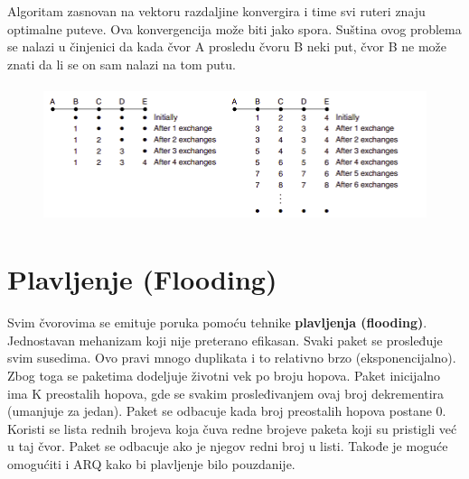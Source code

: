 \documentclass[a4paper]{article}
\begin{document}
        Algoritam zasnovan na vektoru razdaljine
        konvergira i time svi ruteri znaju optimalne puteve. Ova konvergencija može biti jako spora.
        Suština ovog problema se nalazi u činjenici da kada čvor A prosledu čvoru B neki put,
        čvor B ne može znati da li se on sam nalazi na tom putu.
        \begin{figure}[H]
            \begin{center}
                \includegraphics[width=120mm,height=40mm]{Slike/brojanje_do_beskonacnosti.png}
            \end{center}
        \end{figure}

\section{Plavljenje (Flooding)}
    Svim čvorovima se emituje poruka pomoću tehnike \textbf{plavljenja (flooding)}. Jednostavan mehanizam 
    koji nije preterano efikasan. Svaki paket se prosleđuje svim susedima. Ovo pravi
    mnogo duplikata i to relativno brzo (eksponencijalno). Zbog toga se paketima dodeljuje životni vek po broju
    hopova. Paket inicijalno ima K preostalih hopova, gde se svakim prosleđivanjem ovaj broj
    dekrementira (umanjuje za jedan). Paket se odbacuje kada broj preostalih hopova postane 0. \\
    \indent Koristi se lista rednih brojeva koja čuva redne brojeve paketa koji su pristigli već u taj
    čvor. Paket se odbacuje ako je njegov redni broj u listi. Takođe je moguće omogućiti 
    i ARQ kako bi plavljenje bilo pouzdanije. 
\end{document}
